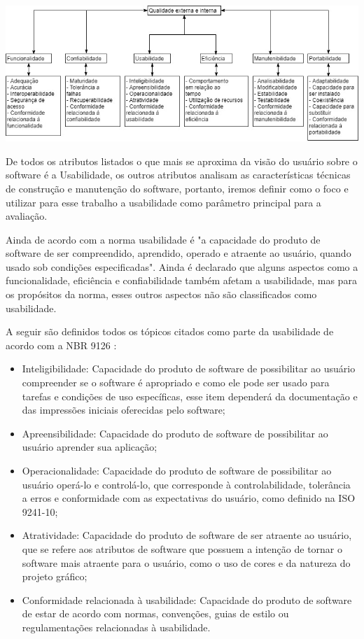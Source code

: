 \begin{center}
	\includegraphics[width=1\linewidth]{figuras/modelodequalidadeiso.jpg}
	\label{img:modelodequalidadeiso}
\end{center}

De todos os atributos listados o que mais se aproxima da visão do usuário sobre o software é a Usabilidade, os outros atributos analisam as características técnicas de construção e manutenção do software, portanto, iremos definir como o foco e utilizar para esse trabalho a usabilidade como parâmetro principal para a avaliação.

Ainda de acordo com a norma \cite{iso9126} usabilidade é "a capacidade do produto de software de ser compreendido, aprendido, operado e atraente ao usuário, quando usado sob condições especificadas". Ainda é declarado que alguns aspectos como a funcionalidade, eficiência e confiabilidade também afetam a usabilidade, mas para os propósitos da norma, esses outros aspectos não são classificados como usabilidade.

A seguir são definidos todos os tópicos citados como parte da usabilidade de acordo com a NBR 9126 \cite{iso9126}:
\begin{itemize}
	\item Inteligibilidade: Capacidade do produto de software de possibilitar ao usuário compreender se o software é apropriado e como ele pode ser
usado para tarefas e condições de uso específicas, esse item dependerá da documentação e das impressões iniciais oferecidas pelo software;
	\item Apreensibilidade: Capacidade do produto de software de possibilitar ao usuário aprender sua aplicação;
	\item Operacionalidade: Capacidade do produto de software de possibilitar ao usuário operá-lo e controlá-lo, que corresponde à controlabilidade, tolerância a erros e conformidade com as expectativas do usuário, como definido na ISO 9241-10;
	\item Atratividade: Capacidade do produto de software de ser atraente ao usuário, que se refere aos atributos de software que possuem a intenção de tornar o software mais atraente para o usuário, como o uso de cores e da natureza do projeto gráfico;
	\item Conformidade relacionada à usabilidade: Capacidade do produto de software de estar de acordo com normas, convenções, guias de estilo ou regulamentações
relacionadas à usabilidade.
\end{itemize}

